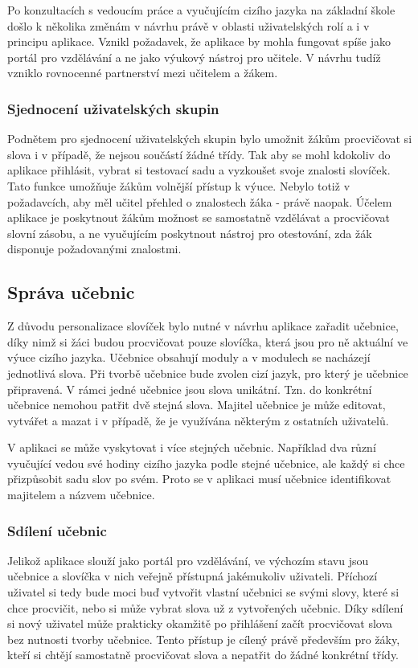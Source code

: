 \documentclass[a4paper,11pt,titlepage,fleqn]{article}
\begin{document}
        Po konzultacích s vedoucím práce a vyučujícím cizího jazyka na základní škole došlo k několika změnám v návrhu právě v oblasti uživatelských rolí a i v principu aplikace. Vznikl požadavek, že aplikace by mohla fungovat spíše jako portál pro vzdělávání a ne jako výukový nástroj pro učitele. V návrhu tudíž vzniklo rovnocenné partnerství mezi učitelem a žákem.

        \subsubsection{Sjednocení uživatelských skupin}
            Podnětem pro sjednocení uživatelských skupin bylo umožnit žákům procvičovat si slova i v případě, že nejsou součástí žádné třídy. Tak aby se mohl kdokoliv do aplikace přihlásit, vybrat si testovací sadu a vyzkoušet svoje znalosti slovíček. Tato funkce umožňuje žákům volnější přístup k výuce. Nebylo totiž v požadavcích, aby měl učitel přehled o znalostech žáka - právě naopak. Účelem aplikace je poskytnout žákům možnost se samostatně vzdělávat a procvičovat slovní zásobu, a ne vyučujícím poskytnout nástroj pro otestování, zda žák disponuje požadovanými znalostmi. 

    \subsection{Správa učebnic}
        Z důvodu personalizace slovíček bylo nutné v návrhu aplikace zařadit učebnice, díky nimž si žáci budou procvičovat pouze slovíčka, která jsou pro ně aktuální ve výuce cizího jazyka. Učebnice obsahují moduly a v modulech se nacházejí jednotlivá slova. Při tvorbě učebnice bude zvolen cizí jazyk, pro který je učebnice připravená. V rámci jedné učebnice jsou slova unikátní. Tzn. do konkrétní učebnice nemohou patřit dvě stejná slova. Majitel učebnice je může editovat, vytvářet a mazat i v případě, že je využívána některým z ostatních uživatelů. 

        V aplikaci se může vyskytovat i více stejných učebnic. Například dva různí vyučující vedou své hodiny cizího jazyka podle stejné učebnice, ale každý si chce přizpůsobit sadu slov po svém. Proto se v aplikaci musí učebnice identifikovat majitelem a názvem učebnice.

        \subsubsection{Sdílení učebnic}
            Jelikož aplikace slouží jako portál pro vzdělávání, ve výchozím stavu jsou učebnice a slovíčka v nich veřejně přístupná jakémukoliv uživateli. Příchozí uživatel si tedy bude moci buď vytvořit vlastní učebnici se svými slovy, které si chce procvičit, nebo si může vybrat slova už z vytvořených učebnic. Díky sdílení si nový uživatel může prakticky okamžitě po přihlášení začít procvičovat slova bez nutnosti tvorby učebnice. Tento přístup je cílený právě především pro žáky, kteří si chtějí samostatně procvičovat slova a nepatřit do žádné konkrétní třídy.
\end{document}
